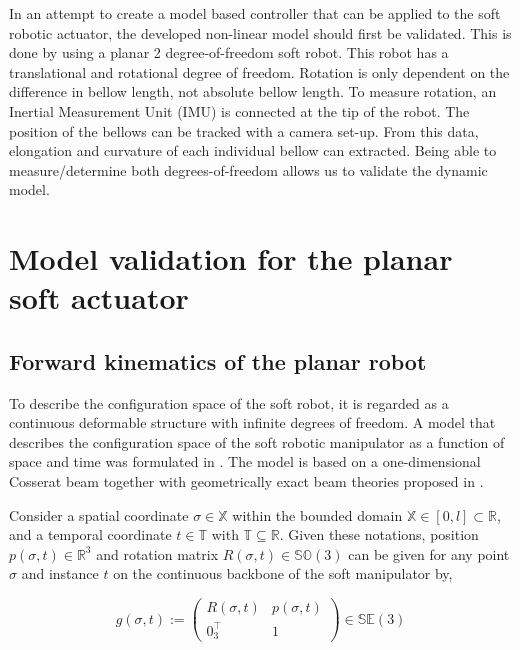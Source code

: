 In an attempt to create a model based controller that can be applied to the soft robotic actuator, the developed non-linear model should first be validated. This is done by using a planar 2 degree-of-freedom soft robot. This robot has a translational and rotational degree of freedom. Rotation is only dependent on the difference in bellow length, not absolute bellow length. To measure rotation, an Inertial Measurement Unit (IMU) is connected at the tip of the robot. The position of the bellows can be tracked with a camera set-up. From this data, elongation and curvature of each individual bellow can extracted. Being able to measure/determine both degrees-of-freedom allows us to validate the dynamic model.

\section{Model validation for the planar soft actuator}

\subsection{Forward kinematics of the planar robot}

To describe the configuration space of the soft robot, it is regarded as a continuous deformable structure with infinite degrees of freedom.
A model that describes the configuration space of the soft robotic manipulator as a function of space and time was formulated in \cite{Caasenbrood2020}. The model is based on a one-dimensional Cosserat beam together with geometrically exact beam theories proposed in \cite{Simo1986}.

Consider a spatial coordinate $\sigma \in \mathbb{X}$ within the bounded domain $\mathbb{X} \in [0,l] \subset \mathbb{R}$, and a temporal coordinate $t \in  \mathbb{T}$ with $\mathbb{T} \subseteq \mathbb{R}$. Given these notations, position $p(\sigma,t) \in \mathbb{R}^3$ and rotation matrix $R(\sigma,t) \in \mathbb{SO}(3)$ can be given for any point $\sigma$ and instance $t$ on the continuous backbone of the soft manipulator by,

\begin{equation}
    g(\sigma,t) := \begin{pmatrix}  R(\sigma,t) & p(\sigma,t) \\ 0_3^\top & 1 \end{pmatrix} \in \mathbb{SE}(3)
    \label{eq2:g}
\end{equation}

